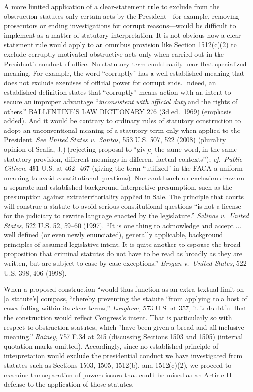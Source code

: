 A more limited application of a clear-statement rule to exclude from the obstruction statutes only certain acts by the President---for example, removing prosecutors or ending investigations for corrupt reasons---would be difficult to implement as a matter of statutory interpretation.
It is not obvious how a clear-statement rule would apply to an omnibus provision like Section 1512(c)(2) to exclude corruptly motivated obstructive acts only when carried out in the President’s conduct of office.
No statutory term could easily bear that specialized meaning.
For example, the word “corruptly” has a well-established meaning that does not exclude exercises of official power for corrupt ends.
Indeed, an established definition states that “corruptly” means action with an intent to secure an improper advantage “\textit{inconsistent with official duty} and the rights of others.”
BALLENTINE’S LAW DICTIONARY 276 (3d ed.~1969) (emphasis added).
And it would be contrary to ordinary rules of statutory construction to adopt an unconventional meaning of a statutory term only when applied to the President.
\textit{See United States v.\ Santos}, 553 U.S. 507, 522 (2008) (plurality opinion of Scalia, J.) (rejecting proposal to “giv[e] the same word, in the same statutory provision, different meanings in different factual contexts”);
\textit{cf.~Public Citizen}, 491 U.S. at 462- 467 (giving the term “utilized” in the FACA a uniform meaning to avoid constitutional questions).
Nor could such an exclusion draw on a separate and established background interpretive presumption, such as the presumption against extraterritoriality applied in Sale.
The principle that courts will construe a statute to avoid serious constitutional questions “is not a license for the judiciary to rewrite language enacted by the legislature.”
\textit{Salinas v.\ United States}, 522 U.S. 52, 59--60 (1997).
“It is one thing to acknowledge and accept ... well defined (or even newly enunciated), generally applicable, background principles of assumed legislative intent.
It is quite another to espouse the broad proposition that criminal statutes do not have to be read as broadly as they are written, but are subject to case-by-case exceptions.”
\textit{Brogan v.\ United States}, 522 U.S. 398, 406 (1998).

When a proposed construction “would thus function as an extra-textual limit on [a statute’s] compass, “thereby preventing the statute “from applying to a host of cases falling within its clear terms,” \textit{Loughrin}, 573 U.S. at 357, it is doubtful that the construction would reflect Congress’s intent.
That is particularly so with respect to obstruction statutes, which “have been given a broad and all-inclusive meaning.”
\textit{Rainey}, 757 F.3d at 245 (discussing Sections 1503 and 1505) (internal quotation marks omitted).
Accordingly, since no established principle of interpretation would exclude the presidential conduct we have investigated from statutes such as Sections 1503, 1505, 1512(b), and 1512(c)(2), we proceed to examine the separation-of-powers issues that could be raised as an Article II defense to the application of those statutes.

